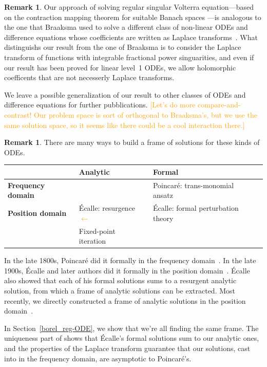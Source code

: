 \documentclass{article}
\theoremstyle{definition}
\newtheorem{remark}[definition]{Remark}
\theoremstyle{plain}
\begin{document}
\begin{remark}
Our approach of solving regular singular Volterra equation---based on the contraction mapping theorem for suitable Banach spaces \cite{reg-sing-volterra}---is analogous to the one that Braaksma used to solve a different class of non-linear ODEs and difference equations whose coefficients are written as Laplace transforms~\cite{braaksma2006laplace}. What distinguishs our result from the one of Braaksma is to consider the Laplace transform of functions with integrable fractional power singuarities, and even if our result has been proved for linear level~1 ODEs, we allow holomorphic coefficents that are not necesserly Laplace transforms. 

We leave a possible generalization of our result to other classes of ODEs and difference equations for further pubblications. \textcolor{orange}{[Let's do more compare-and-contrast! Our problem space is sort of orthogonal to Braaksma's, but we use the same solution space, so it seems like there could be a cool interaction there.]}
\end{remark}

\begin{remark}
There are many ways to build a frame of solutions for these kinds of ODEs.
\begin{center}
\begin{tabular}{l|l|l}
& \textbf{Analytic} & \textbf{Formal} \\ \hline
\textbf{Frequency domain} &  & Poincar\'{e}: trans-monomial ansatz~\cite{int-irreg} \\ \hline
\textbf{Position domain} & \'{E}calle: resurgence \textcolor{orange}{$\longleftarrow$} & \'{E}calle: formal perturbation theory~\cite{EcalleIII,loday-Remy2011} \\
& Fixed-point iteration~\cite{reg-sing-volterra} \\
\end{tabular}
\end{center}
In the late 1800s, Poincar\'{e} did it formally in the frequency domain~\cite{int-irreg}. In the late 1900s, \'{E}calle and later authors did it formally in the position domain~\cite{EcalleIII,loday-Remy2011}. \'{E}calle also showed that each of his formal solutions sums to a resurgent analytic solution, from which a frame of analytic solutions can be extracted. Most recently, we directly constructed a frame of analytic solutions in the position domain~\cite{reg-sing-volterra}.

In Section~\ref{borel_reg-ODE}, we show that we're all finding the same frame. The uniqueness part of \cite[Theorem~4]{reg-sing-volterra} shows that \'{E}calle's formal solutions sum to our analytic ones, and the properties of the Laplace transform guarantee that our solutions, cast into in the frequency domain, are asymptotic to Poincar\'{e}'s.
\end{remark} 
%
%
%
\end{document}
